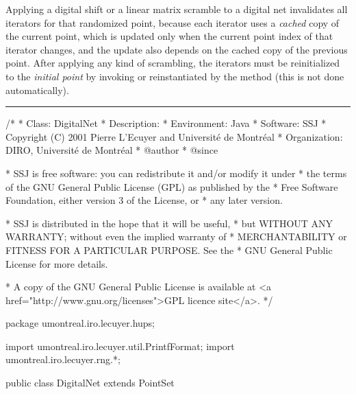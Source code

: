 Applying a digital shift or a linear matrix scramble to a digital net
invalidates all iterators for that randomized point,
because each iterator uses a
\emph{cached} copy of the current point, which is updated only when
the current point index of that iterator changes, and the update also
depends on the cached copy of the previous point.
After applying any kind of scrambling, the iterators must be
reinitialized to the \emph{initial point} by invoking
or reinstantiated by the  method
(this is not done automatically).


\bigskip\hrule\bigskip

\begin{code}
\begin{hide}
/*
 * Class:        DigitalNet
 * Description:  
 * Environment:  Java
 * Software:     SSJ 
 * Copyright (C) 2001  Pierre L'Ecuyer and Université de Montréal
 * Organization: DIRO, Université de Montréal
 * @author       
 * @since

 * SSJ is free software: you can redistribute it and/or modify it under
 * the terms of the GNU General Public License (GPL) as published by the
 * Free Software Foundation, either version 3 of the License, or
 * any later version.

 * SSJ is distributed in the hope that it will be useful,
 * but WITHOUT ANY WARRANTY; without even the implied warranty of
 * MERCHANTABILITY or FITNESS FOR A PARTICULAR PURPOSE.  See the
 * GNU General Public License for more details.

 * A copy of the GNU General Public License is available at
   <a href="http://www.gnu.org/licenses">GPL licence site</a>.
 */
\end{hide}
package umontreal.iro.lecuyer.hups;\begin{hide}

import umontreal.iro.lecuyer.util.PrintfFormat;
import umontreal.iro.lecuyer.rng.*;
\end{hide}

public class DigitalNet extends PointSet \begin{hide} {

}
\end{hide}
\end{code}

